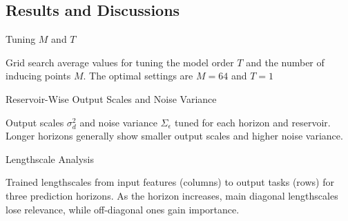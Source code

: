 \subsection{Results and Discussions}

\begin{frame}{Tuning $M$ and $T$}
	\begin{figure}[htbp]
		\setlength{} 
		\setlength{}
		\hspace{-1em}
	\end{figure}
	\vspace{-2em}
	\begin{block}{}
		Grid search average values for tuning the model order $T$ and the number of inducing points $M$. The optimal settings are $M=64$ and $T=1$
	\end{block}
\end{frame}


\begin{frame}{Reservoir-Wise Output Scales and Noise Variance}
	
	\begin{figure}[htbp]
	 	\setlength{} 
		\setlength{}
		\hspace{-1em}
	\end{figure}
	\vspace{-2.5em}
	\begin{block}{}
	Output scales $\sigma^2_d$ and noise variance $\Sigma_\epsilon$ tuned for each horizon and reservoir. Longer horizons generally show smaller output scales and higher noise variance.
	\end{block}
\end{frame}


\begin{frame}{Lengthscale Analysis}
	\begin{figure}[htbp]
		\centering
		\tiny
		\setlength{} 
		\setlength{}
		\subfloat[$H=1.$]{}\hspace{-1.3em}
		\subfloat[$H=14.$]{}\hspace{-1.3em}
		\subfloat[$H=30.$]{}
	\end{figure}
	\vspace{-2.5em}
	\begin{block}{}
	Trained lengthscales from input features (columns) to output tasks (rows) for three prediction horizons. As the horizon increases, main diagonal lengthscales lose relevance, while off-diagonal ones gain importance.
	\end{block}
\end{frame}

